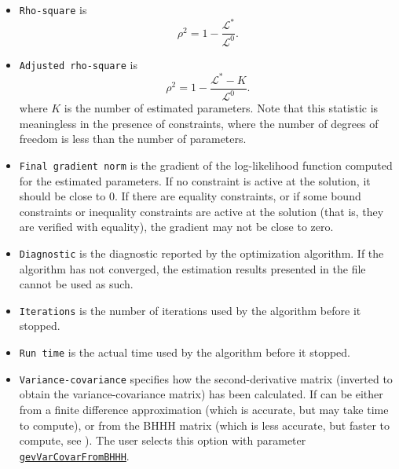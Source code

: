 \documentclass[12pt]{memoir}
\begin{document}
\begin{itemize}
      \item \verb+Rho-square+ is
         \begin{equation}
            \rho^2 = 1 - \frac{\mathcal{L}^*}{\mathcal{L}^0}.
         \end{equation}
        \item \verb+Adjusted rho-square+ is
         \begin{equation}
            \rho^2 = 1 - \frac{\mathcal{L}^* - K}{\mathcal{L}^0}.
         \end{equation}
         where $K$ is the number of estimated parameters. Note that this statistic is meaningless in the presence of constraints, where the number of degrees of freedom is less than  the number of parameters. 
      \item \verb+Final gradient norm+ is the gradient of the log-likelihood function computed for the estimated parameters. If no constraint is active at the solution, it should be close to 0. If there are equality constraints, or if some bound constraints or inequality constraints are active at the solution (that is, they are verified with equality), the gradient may not be close to zero. 
\item \verb+Diagnostic+ is the diagnostic reported by the optimization
algorithm. If the algorithm has not converged, the estimation results presented
in the file cannot be used as such. 
\item \verb+Iterations+ is the number of iterations used by the
algorithm before it stopped. 
\item \verb+Run time+ is the actual time used by the algorithm before
it stopped.
   \item \verb+Variance-covariance+ specifies how the second-derivative matrix (inverted to obtain the variance-covariance matrix) has been calculated. If can be either from a finite difference approximation  (which is accurate, but may take time to compute), or from the BHHH matrix (which is less accurate, but faster to compute, see
         \cite{BernHallHallHaus74}). The user selects this option with parameter \hyperlink{gevVarCovarFromBHHH}{\texttt{gevVarCovarFromBHHH}}.
   \end{itemize}
\end{document}
